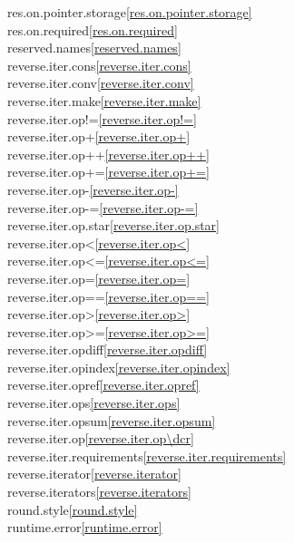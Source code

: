 \begin{multicols}{2}
res.on.pointer.storage\quad\ref{res.on.pointer.storage}\\
res.on.required\quad\ref{res.on.required}\\
reserved.names\quad\ref{reserved.names}\\
reverse.iter.cons\quad\ref{reverse.iter.cons}\\
reverse.iter.conv\quad\ref{reverse.iter.conv}\\
reverse.iter.make\quad\ref{reverse.iter.make}\\
reverse.iter.op!=\quad\ref{reverse.iter.op!=}\\
reverse.iter.op+\quad\ref{reverse.iter.op+}\\
reverse.iter.op++\quad\ref{reverse.iter.op++}\\
reverse.iter.op+=\quad\ref{reverse.iter.op+=}\\
reverse.iter.op-\quad\ref{reverse.iter.op-}\\
reverse.iter.op-=\quad\ref{reverse.iter.op-=}\\
reverse.iter.op.star\quad\ref{reverse.iter.op.star}\\
reverse.iter.op<\quad\ref{reverse.iter.op<}\\
reverse.iter.op<=\quad\ref{reverse.iter.op<=}\\
reverse.iter.op=\quad\ref{reverse.iter.op=}\\
reverse.iter.op==\quad\ref{reverse.iter.op==}\\
reverse.iter.op>\quad\ref{reverse.iter.op>}\\
reverse.iter.op>=\quad\ref{reverse.iter.op>=}\\
reverse.iter.opdiff\quad\ref{reverse.iter.opdiff}\\
reverse.iter.opindex\quad\ref{reverse.iter.opindex}\\
reverse.iter.opref\quad\ref{reverse.iter.opref}\\
reverse.iter.ops\quad\ref{reverse.iter.ops}\\
reverse.iter.opsum\quad\ref{reverse.iter.opsum}\\
reverse.iter.op\dcr\quad\ref{reverse.iter.op\dcr}\\
reverse.iter.requirements\quad\ref{reverse.iter.requirements}\\
reverse.iterator\quad\ref{reverse.iterator}\\
reverse.iterators\quad\ref{reverse.iterators}\\
round.style\quad\ref{round.style}\\
runtime.error\quad\ref{runtime.error}\\

\end{multicols}
